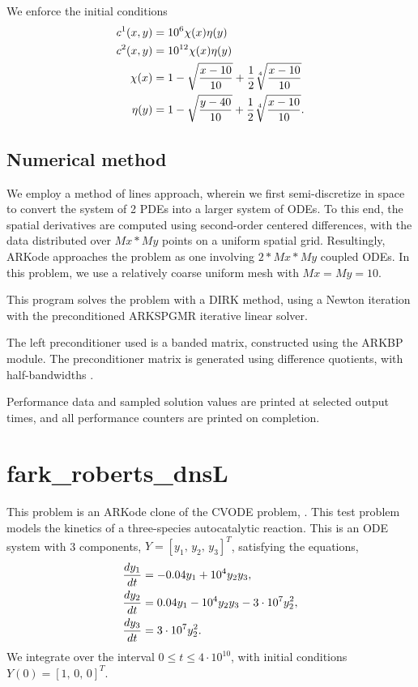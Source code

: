 \documentclass[letterpaper,10pt,english]{sphinxmanual}
\begin{document}
We enforce the initial conditions
\begin{gather}
\begin{split}c^1(x,y) &=  10^6 \chi(x)\eta(y) \\
c^2(x,y) &=  10^{12} \chi(x)\eta(y) \\
\chi(x) &= 1 - \sqrt{\frac{x - 10}{10}} + \frac12 \sqrt[4]{\frac{x - 10}{10}} \\
\eta(y) &= 1 - \sqrt{\frac{y - 40}{10}} + \frac12 \sqrt[4]{\frac{x - 10}{10}}.\end{split}\notag
\end{gather}

\subsection{Numerical method}
\label{f77_serial:numerical-method}
We employ a method of lines approach, wherein we first
semi-discretize in space to convert the system of 2 PDEs into a larger
system of ODEs.  To this end, the spatial derivatives are computed
using second-order centered differences, with the data distributed
over \(Mx*My\) points on a uniform spatial grid.  Resultingly, ARKode
approaches the problem as one involving \(2*Mx*My\) coupled ODEs.
In this problem, we use a relatively coarse uniform mesh with
\(Mx=My=10\).

This program solves the problem with a DIRK method, using a Newton
iteration with the preconditioned ARKSPGMR iterative linear solver.

The left preconditioner used is a banded matrix, constructed using
the ARKBP module.  The preconditioner matrix is generated using
difference quotients, with half-bandwidths .

Performance data and sampled solution values are printed at
selected output times, and all performance counters are printed
on completion.


\section{fark\_roberts\_dnsL}
\label{f77_serial:id2}\label{f77_serial:fark-roberts-dnsl}
This problem is an ARKode clone of the CVODE problem,
.  This test problem models the kinetics of a
three-species autocatalytic reaction.  This is an ODE system with 3
components, \(Y = [y_1,\, y_2,\, y_3]^T\), satisfying the equations,
\begin{gather}
\begin{split}\frac{d y_1}{dt} &= -0.04 y_1 + 10^4 y_2 y_3, \\
\frac{d y_2}{dt} &= 0.04 y_1 - 10^4 y_2 y_3 - 3\cdot10^7 y_2^2, \\
\frac{d y_3}{dt} &= 3\cdot10^7 y_2^2.\end{split}\notag
\end{gather}
We integrate over the interval \(0\le t\le 4\cdot10^{10}\), with initial
conditions  \(Y(0) = [1,\, 0,\, 0]^T\).
\end{document}

